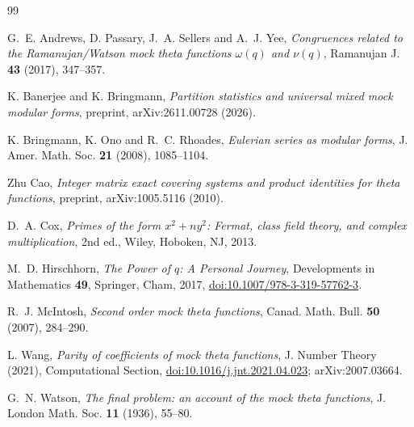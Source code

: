 \documentclass[11pt]{amsart}
\theoremstyle{definition}
\theoremstyle{remark}
\numberwithin{equation}{section}
\begin{document}
\begin{thebibliography}{99}

G.~E. Andrews, D. Passary, J.~A. Sellers and A.~J. Yee,
\emph{Congruences related to the Ramanujan/Watson mock theta functions $\omega(q)$ and $\nu(q)$},
Ramanujan J. \textbf{43} (2017), 347--357.

K. Banerjee and K. Bringmann,
\emph{Partition statistics and universal mixed mock modular forms},
preprint, arXiv:2611.00728 (2026).

K. Bringmann, K. Ono and R.~C. Rhoades,
\emph{Eulerian series as modular forms},
J. Amer. Math. Soc. \textbf{21} (2008), 1085--1104.

Zhu Cao,
\emph{Integer matrix exact covering systems and product identities for theta functions},
preprint, arXiv:1005.5116 (2010).

D.~A. Cox,
\emph{Primes of the form $x^2+ny^2$: Fermat, class field theory, and complex multiplication},
2nd ed., Wiley, Hoboken, NJ, 2013.

M.~D. Hirschhorn,
\emph{The Power of $q$: A Personal Journey},
Developments in Mathematics \textbf{49}, Springer, Cham, 2017, \href{https://doi.org/10.1007/978-3-319-57762-3}{doi:10.1007/978-3-319-57762-3}.

R.~J. McIntosh,
\emph{Second order mock theta functions},
Canad. Math. Bull. \textbf{50} (2007), 284--290.

L. Wang,
\emph{Parity of coefficients of mock theta functions},
J. Number Theory (2021), Computational Section, \href{https://doi.org/10.1016/j.jnt.2021.04.023}{doi:10.1016/j.jnt.2021.04.023}; arXiv:2007.03664.

G.~N. Watson,
\emph{The final problem: an account of the mock theta functions},
J. London Math. Soc. \textbf{11} (1936), 55--80.

\end{thebibliography}
\end{document}
